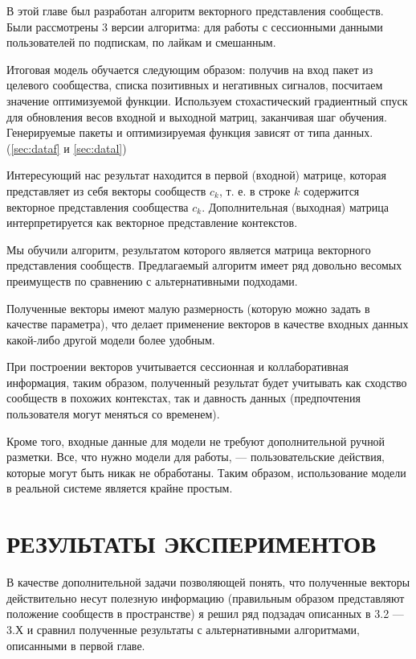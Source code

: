 \documentclass[times,specification,annotation]{itmo-student-thesis}
\begin{document}
\chapterconclusion

В этой главе был разработан алгоритм векторного представления сообществ. Были рассмотрены 3 версии алгоритма: для работы с сессионными данными пользователей по подпискам, по лайкам и смешанным.

Итоговая модель обучается следующим образом: получив на вход пакет из
целевого сообщества, списка позитивных и негативных сигналов, посчитаем
значение оптимизуемой функции. Используем стохастический градиентный спуск для обновления весов входной и выходной матриц, заканчивая шаг обучения. Генерируемые пакеты и оптимизируемая функция зависят от типа данных. (\ref{sec:dataf} и \ref{sec:datal})

Интересующий нас результат находится в первой (входной) матрице, которая
представляет из себя векторы сообществ $c_k$, т. е. в строке $k$ содержится векторное
представления сообщества $c_k$. Дополнительная (выходная) матрица
интерпретируется как векторное представление контекстов.

Мы обучили алгоритм, результатом которого является матрица векторного
представления сообществ. Предлагаемый алгоритм имеет ряд довольно весомых
преимуществ по сравнению с альтернативными подходами. 

Полученные векторы
имеют малую размерность (которую можно задать в качестве параметра), что
делает применение векторов в качестве входных данных какой-либо другой
модели более удобным. 

При построении векторов учитывается сессионная и
коллаборативная информация, таким образом, полученный результат будет
учитывать как сходство сообществ в похожих контекстах, так и давность данных
(предпочтения пользователя могут меняться со временем). 

Кроме того, входные данные для модели не требуют дополнительной ручной разметки. Все, что нужно модели для работы, --- пользовательские действия, которые могут быть никак не обработаны. Таким образом, использование модели в реальной системе является крайне простым.

\chapter{РЕЗУЛЬТАТЫ ЭКСПЕРИМЕНТОВ}

В качестве дополнительной задачи позволяющей понять, что полученные
векторы действительно несут полезную информацию (правильным образом
представляют положение сообществ в пространстве) я решил ряд подзадач
описанных в 3.2 --- 3.Х и сравнил полученные результаты с альтернативными
алгоритмами, описанными в первой главе.
\end{document}
